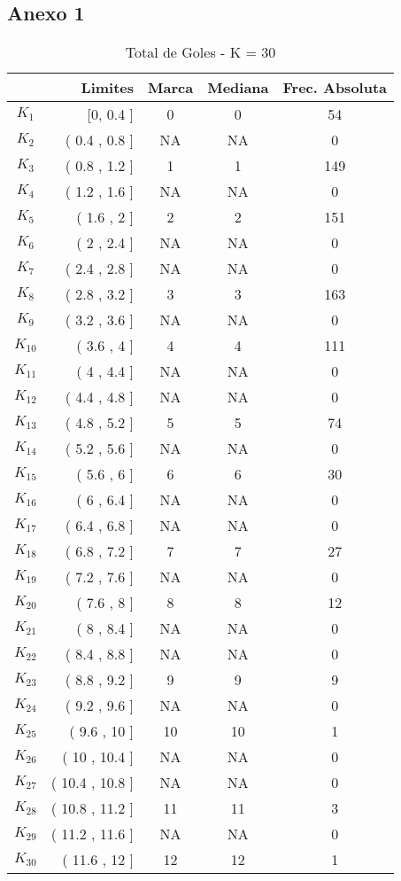 \subsection*{Anexo 1}

\begin{table}[ht]
\centering
\caption*{Total de Goles - K = 30}
\begin{tabular}{crccc}
  \hline
 & Limites & Marca & Mediana & Frec. Absoluta \\ 
\hline
  $K_{1}$ & [0, 0.4 ] & 0 & 0 & 54 \\ 
  $K_{2}$ & ( 0.4 , 0.8 ] & NA & NA & 0 \\ 
  $K_{3}$ & ( 0.8 , 1.2 ] & 1 & 1 & 149 \\ 
  $K_{4}$ & ( 1.2 , 1.6 ] & NA & NA & 0 \\ 
  $K_{5}$ & ( 1.6 , 2 ] & 2 & 2 & 151 \\ 
  $K_{6}$ & ( 2 , 2.4 ] & NA & NA & 0 \\ 
  $K_{7}$ & ( 2.4 , 2.8 ] & NA & NA & 0 \\ 
  $K_{8}$ & ( 2.8 , 3.2 ] & 3 & 3 & 163 \\ 
  $K_{9}$ & ( 3.2 , 3.6 ] & NA & NA & 0 \\ 
  $K_{10}$ & ( 3.6 , 4 ] & 4 & 4 & 111 \\ 
  $K_{11}$ & ( 4 , 4.4 ] & NA & NA & 0 \\ 
  $K_{12}$ & ( 4.4 , 4.8 ] & NA & NA & 0 \\ 
  $K_{13}$ &( 4.8 , 5.2 ] & 5 & 5 & 74 \\ 
  $K_{14}$ & ( 5.2 , 5.6 ] & NA & NA & 0 \\ 
  $K_{15}$ & ( 5.6 , 6 ] & 6 & 6 & 30 \\ 
  $K_{16}$ & ( 6 , 6.4 ] & NA & NA & 0 \\ 
  $K_{17}$ & ( 6.4 , 6.8 ] & NA & NA & 0 \\ 
  $K_{18}$ & ( 6.8 , 7.2 ] & 7 & 7 & 27 \\ 
  $K_{19}$ & ( 7.2 , 7.6 ] & NA & NA & 0 \\ 
  $K_{20}$ & ( 7.6 , 8 ] & 8 & 8 & 12 \\ 
  $K_{21}$ & ( 8 , 8.4 ] & NA & NA & 0 \\ 
  $K_{22}$ & ( 8.4 , 8.8 ] & NA & NA & 0 \\ 
  $K_{23}$ & ( 8.8 , 9.2 ] & 9 & 9 & 9 \\ 
  $K_{24}$ & ( 9.2 , 9.6 ] & NA & NA & 0 \\ 
  $K_{25}$ & ( 9.6 , 10 ] & 10 & 10 & 1 \\ 
  $K_{26}$ & ( 10 , 10.4 ] & NA & NA & 0 \\ 
  $K_{27}$ & ( 10.4 , 10.8 ] & NA & NA & 0 \\ 
  $K_{28}$ & ( 10.8 , 11.2 ] & 11 & 11 & 3 \\ 
  $K_{29}$ & ( 11.2 , 11.6 ] & NA & NA & 0 \\ 
  $K_{30}$ & ( 11.6 , 12 ] & 12 & 12 & 1 \\ 
   \hline
\end{tabular}
\end{table}

